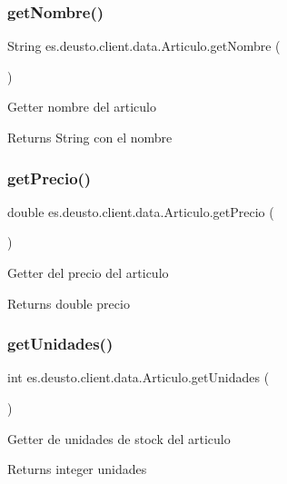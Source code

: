 \subsubsection{\texorpdfstring{getNombre()}{getNombre()}}
{\footnotesize\ttfamily String es.\+deusto.\+client.\+data.\+Articulo.\+get\+Nombre (\begin{DoxyParamCaption}{ }\end{DoxyParamCaption})}

Getter nombre del articulo \begin{DoxyReturn}{Returns}
String con el nombre 
\end{DoxyReturn}
\mbox{\label{classes_1_1deusto_1_1client_1_1data_1_1_articulo_a071f49825a1a7ddfcccc723c634337b0}} 
\subsubsection{\texorpdfstring{getPrecio()}{getPrecio()}}
{\footnotesize\ttfamily double es.\+deusto.\+client.\+data.\+Articulo.\+get\+Precio (\begin{DoxyParamCaption}{ }\end{DoxyParamCaption})}

Getter del precio del articulo \begin{DoxyReturn}{Returns}
double precio 
\end{DoxyReturn}
\mbox{\label{classes_1_1deusto_1_1client_1_1data_1_1_articulo_abc6dd64d5c05ad20130a5cf36ccbb9a3}} 
\subsubsection{\texorpdfstring{getUnidades()}{getUnidades()}}
{\footnotesize\ttfamily int es.\+deusto.\+client.\+data.\+Articulo.\+get\+Unidades (\begin{DoxyParamCaption}{ }\end{DoxyParamCaption})}

Getter de unidades de stock del articulo \begin{DoxyReturn}{Returns}
integer unidades 
\end{DoxyReturn}
\mbox{\label{classes_1_1deusto_1_1client_1_1data_1_1_articulo_ae1fc25e318b720902e5b3d1c4c654b6b}} 
